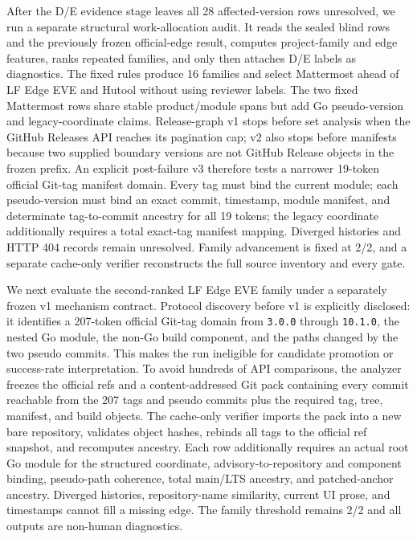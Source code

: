 After the D/E evidence stage leaves all 28 affected-version rows unresolved, we run a separate structural work-allocation audit. It reads the sealed blind rows and the previously frozen official-edge result, computes project-family and edge features, ranks repeated families, and only then attaches D/E labels as diagnostics. The fixed rules produce 16 families and select Mattermost ahead of LF Edge EVE and Hutool without using reviewer labels. The two fixed Mattermost rows share stable product/module spans but add Go pseudo-version and legacy-coordinate claims. Release-graph v1 stops before set analysis when the GitHub Releases API reaches its pagination cap; v2 also stops before manifests because two supplied boundary versions are not GitHub Release objects in the frozen prefix. An explicit post-failure v3 therefore tests a narrower 19-token official Git-tag manifest domain. Every tag must bind the current  module; each pseudo-version must bind an exact commit, timestamp, module manifest, and determinate tag-to-commit ancestry for all 19 tokens; the legacy coordinate additionally requires a total exact-tag manifest mapping. Diverged histories and HTTP 404 records remain unresolved. Family advancement is fixed at 2/2, and a separate cache-only verifier reconstructs the full source inventory and every gate.

We next evaluate the second-ranked LF Edge EVE family under a separately frozen v1 mechanism contract. Protocol discovery before v1 is explicitly disclosed: it identifies a 207-token official Git-tag domain from \texttt{3.0.0} through \texttt{10.1.0}, the nested  Go module, the non-Go  build component, and the paths changed by the two pseudo commits. This makes the run ineligible for candidate promotion or success-rate interpretation. To avoid hundreds of API comparisons, the analyzer freezes the official refs and a content-addressed Git pack containing every commit reachable from the 207 tags and pseudo commits plus the required tag, tree, manifest, and build objects. The cache-only verifier imports the pack into a new bare repository, validates object hashes, rebinds all tags to the official ref snapshot, and recomputes ancestry. Each row additionally requires an actual root Go module for the structured coordinate, advisory-to-repository and component binding, pseudo-path coherence, total main/LTS ancestry, and patched-anchor ancestry. Diverged histories, repository-name similarity, current UI prose, and timestamps cannot fill a missing edge. The family threshold remains 2/2 and all outputs are non-human diagnostics.

